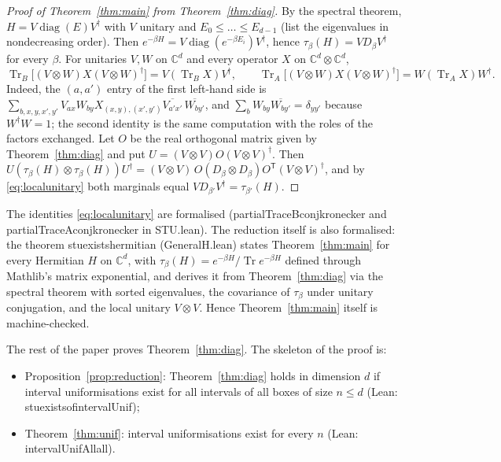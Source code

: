 \documentclass[11pt]{amsart}
\theoremstyle{definition}
\theoremstyle{remark}
\numberwithin{equation}{section}
\newcommand{\C}{\mathbb{C}}
\newcommand{\Tr}{\operatorname{Tr}}
\newcommand{\diag}{\operatorname{diag}}
\newcommand{\leanus}{\textunderscore\allowbreak}
\newcommand{\lean}[1]{{\ttfamily\let\_\leanus #1}}
\begin{document}
\begin{proof}[Proof of Theorem~\ref{thm:main} from Theorem~\ref{thm:diag}]
By the spectral theorem, $H=V\diag(E)V^\dagger$ with $V$ unitary and $E_0\le\dots\le E_{d-1}$ (list the
eigenvalues in nondecreasing order). Then $e^{-\beta H}=V\diag(e^{-\beta E_i})V^\dagger$, hence
$\tau_\beta(H)=VD_\beta V^\dagger$ for every $\beta$. For unitaries $V,W$ on $\C^d$ and every operator
$X$ on $\C^d\otimes\C^d$,
\begin{equation}\label{eq:localunitary}
  \Tr_B\bigl[(V\otimes W)X(V\otimes W)^\dagger\bigr]=V(\Tr_B X)V^\dagger,\qquad
  \Tr_A\bigl[(V\otimes W)X(V\otimes W)^\dagger\bigr]=W(\Tr_A X)W^\dagger .
\end{equation}
Indeed, the $(a,a')$ entry of the first left-hand side is
$\sum_{b,x,y,x',y'}V_{ax}W_{by}X_{(x,y),(x',y')}\overline{V_{a'x'}}\,\overline{W_{by'}}$, and
$\sum_b W_{by}\overline{W_{by'}}=\delta_{yy'}$ because $W^\dagger W=1$; the second identity is the same
computation with the roles of the factors exchanged. Let $O$ be the real orthogonal matrix given by
Theorem~\ref{thm:diag} and put $U=(V\otimes V)O(V\otimes V)^\dagger$. Then
$U(\tau_\beta(H)\otimes\tau_\beta(H))U^\dagger=(V\otimes V)\,O(D_\beta\otimes D_\beta)O^{\mathsf T}(V\otimes V)^\dagger$,
and by \eqref{eq:localunitary} both marginals equal $VD_{\beta'}V^\dagger=\tau_{\beta'}(H)$.
\end{proof}

The identities \eqref{eq:localunitary} are formalised (\lean{partialTraceB\_conj\_kronecker} and
\lean{partialTraceA\_conj\_kronecker} in \lean{STU.lean}). The reduction itself is also formalised: the
theorem \lean{stu\_exists\_hermitian} (\lean{GeneralH.lean}) states Theorem~\ref{thm:main} for every
Hermitian $H$ on $\C^d$, with $\tau_\beta(H)=e^{-\beta H}/\Tr e^{-\beta H}$ defined through Mathlib's matrix
exponential, and derives it from Theorem~\ref{thm:diag} via the spectral theorem with sorted eigenvalues,
the covariance of $\tau_\beta$ under unitary conjugation, and the local unitary $V\otimes V$. Hence
Theorem~\ref{thm:main} itself is machine-checked.

The rest of the paper proves Theorem~\ref{thm:diag}. The skeleton of the proof is:
\begin{itemize}
\item Proposition~\ref{prop:reduction}: Theorem~\ref{thm:diag} holds in dimension $d$ if interval
uniformisations exist for all intervals of all boxes of size $n\le d$ (Lean:
\lean{stu\_exists\_of\_intervalUnif});
\item Theorem~\ref{thm:unif}: interval uniformisations exist for every $n$ (Lean:
\lean{intervalUnifAll\_all}).
\end{itemize}
\end{document}
